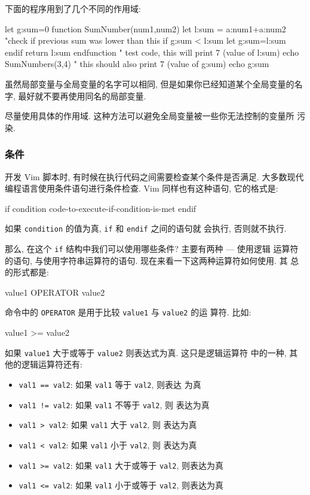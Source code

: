 下面的程序用到了几个不同的作用域:
\begin{vimcode}
let g:sum=0
function SumNumber(num1,num2)
    let l:sum = a:num1+a:num2
    "check if previous sum was lower than this
    if g:sum < l:sum
        let g:sum=l:sum
    endif
    return l:sum
endfunction
" test code, this will print 7 (value of l:sum)
echo SumNumbers(3,4)
" this should also print 7 (value of g:sum)
echo g:sum
\end{vimcode}

虽然局部变量与全局变量的名字可以相同, 但是如果你已经知道某个全局变量的名字,
最好就不要再使用同名的局部变量.

\begin{warning}
    尽量使用具体的作用域. 这种方法可以避免全局变量被一些你无法控制的变量所
    污染.
\end{warning}

\subsubsection{条件}
\label{subsubsec:conditions}

开发 Vim 脚本时, 有时候在执行代码之间需要检查某个条件是否满足. 大多数现代
编程语言使用条件语句进行条件检查. Vim 同样也有这种语句, 它的格式是:
\begin{vimcode}
if condition
    code-to-execute-if-condition-is-met
endif
\end{vimcode}
如果 \texttt{condition} 的值为真, \texttt{if} 和 \texttt{endif} 之间的语句就
会执行, 否则就不执行.

那么, 在这个 \texttt{if} 结构中我们可以使用哪些条件? 主要有两种 --- 使用逻辑
运算符的语句, 与使用字符串运算符的语句. 现在来看一下这两种运算符如何使用. 其
总的形式都是:
\begin{vimcode}
value1 OPERATOR value2
\end{vimcode}
命令中的 \texttt{OPERATOR} 是用于比较 \texttt{value1} 与 \texttt{value2} 的运
算符. 比如:
\begin{vimcode}
value1 >= value2
\end{vimcode}
如果 \texttt{value1} 大于或等于 \texttt{value2} 则表达式为真. 这只是逻辑运算符
中的一种, 其他的逻辑运算符还有:
\begin{itemize}
    \item \texttt{val1 == val2}: 如果 \texttt{val1} 等于 \texttt{val2}, 则表达
        为真
    \item \texttt{val1 != val2}: 如果 \texttt{val1} 不等于 \texttt{val2}, 则
        表达为真
    \item \texttt{val1 > val2}: 如果 \texttt{val1} 大于 \texttt{val2}, 则
        表达为真
    \item \texttt{val1 < val2}: 如果 \texttt{val1} 小于 \texttt{val2}, 则
        表达为真
    \item \texttt{val1 >= val2}: 如果 \texttt{val1} 大于或等于 \texttt{val2},
        则表达为真
    \item \texttt{val1 <= val2}: 如果 \texttt{val1} 小于或等于 \texttt{val2},
        则表达为真
\end{itemize}

